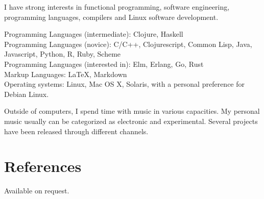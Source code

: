 \documentclass[margintitle,line]{res}
\begin{document}
\begin{resume}
I have strong interests in functional programming, software engineering, programming languages, compilers and Linux software development.

Programming Languages (intermediate): Clojure, Haskell \\
Programming Languages (novice): C/C++, Clojurescript, Common Lisp, Java, Javascript, Python, R, Ruby, Scheme \\
Programming Languages (interested in): Elm, Erlang, Go, Rust \\
Markup Languages: LaTeX, Markdown \\
Operating systems: Linux, Mac OS X, Solaris, with a personal preference for Debian Linux.

Outside of computers, I spend time with music in various capacities. My personal music usually can be categorized as electronic and experimental. Several projects have been released through different channels.

\section{References}

Available on request.

\end{resume}
\end{document}
